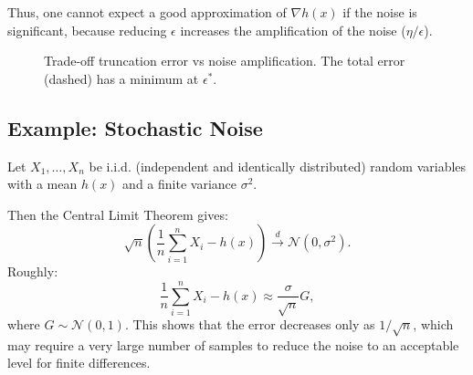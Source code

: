 Thus, one cannot expect a good approximation of $\nabla h(x)$ if the noise is significant, because reducing $\epsilon$ increases the amplification of the noise ($\eta/\epsilon$).

\begin{figure}[H]
\centering
{}
\caption{Trade-off truncation error vs noise amplification. The total error (dashed) has a minimum at $\epsilon^*$.}
\label{fig:error-epsilon}
\end{figure}

\subsection{Example: Stochastic Noise}

Let $X_1, \dots, X_n$ be i.i.d. (independent and identically distributed) random variables with a mean $h(x)$ and a finite variance $\sigma^2$.

Then the Central Limit Theorem gives:
\[
    \sqrt{n} \left( \frac{1}{n} \sum_{i=1}^n X_i - h(x) \right) \xrightarrow{d} \mathcal{N}(0, \sigma^2).
\]
Roughly:
\[
    \frac{1}{n} \sum_{i=1}^n X_i - h(x) \approx \frac{\sigma}{\sqrt{n}} G,
\]
where $G \sim \mathcal{N}(0, 1)$.
This shows that the error decreases only as $1/\sqrt{n}$, which may require a very large number of samples to reduce the noise to an acceptable level for finite differences.

